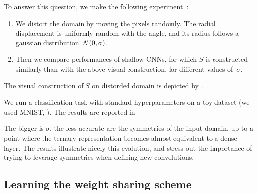 To answer this question, we make the following experiment~\citep{vialatte2016generalizing}:
\begin{enumerate}
\item We distort the domain by moving the pixels randomly. The radial displacement is uniformly random with the angle, and its radius follows a gaussian distribution~$\mathcal{N}(0,\sigma)$.
\item Then we compare performances of shallow CNNs, for which $S$ is constructed similarly than with the above visual construction, for different values of~$\sigma$.
\end{enumerate}

The visual construction of $S$ on distorded domain is depicted by .

{}

We run a classification task with standard hyperparameters on a toy dataset (we used MNIST, \cite{lecun1998mnist}). The results are reported in 



The bigger is $\sigma$, the less accurate are the symmetries of the input domain, up to a point where the ternary representation becomes almost equivalent to a dense layer. The results illustrate nicely this evolution, and stress out the importance of trying to leverage symmetries when defining new convolutions.

\subsection{Learning the weight sharing scheme}




